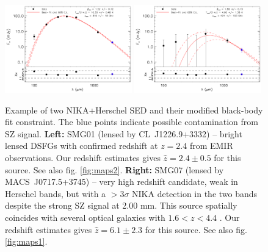 \documentclass[11pt,a4paper,twoside,graphicx,color]{article}
\begin{document}
\begin{figure}[h!]
	\centering
	\includegraphics[width=0.49\textwidth]{SED_fit01.pdf}
	\includegraphics[width=0.49\textwidth]{SED_fit07.pdf}
	\caption{\footnotesize{Example of two NIKA+Herschel SED and their modified black-body fit constraint. The blue points indicate possible contamination from SZ signal. {\bf Left:} SMG01 (lensed by \mbox{CL~J1226.9+3332}) -- bright lensed DSFGs with confirmed redshift at $z = 2.4$ from EMIR observations. Our redshift estimates gives $\hat{z} = 2.4 \pm 0.5$ for this source. See also fig. \ref{fig:maps2}. {\bf Right:} SMG07 (lensed by \mbox{MACS~J0717.5+3745}) -- very high redshift candidate, weak in Herschel bands, but with a $>3 \sigma$ NIKA detection in the two bands despite the strong SZ signal at 2.00 mm. This source spatially coincides with several optical galaxies with $1.6 < z < 4.4$ \citep[see also][for more details]{Adam2016b}. Our redshift estimates gives $\hat{z} = 6.1 \pm 2.3$ for this source. See also fig. \ref{fig:maps1}.}}
	\label{fig:SED}
\end{figure}
\end{document}
